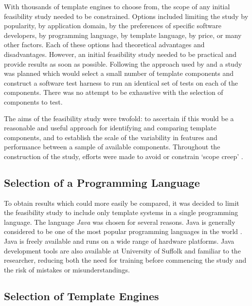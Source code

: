 With thousands of template engines to choose from, the scope of any initial feasibility study needed to be constrained. Options included limiting the study by popularity, by application domain, by the preferences of specific software developers, by programming language, by template language, by price, or many other factors. Each of these options had theoretical advantages and disadvantages. However, an initial feasibility study needed to be practical and provide results as soon as possible. Following the approach used by \citet{Laakso2008} and \citet{Zoio2005} a study was planned which would select a small number of template components and construct a software test harness to run an identical set of tests on each of the components. There was no attempt to be exhaustive with the selection of components to test.

The aims of the feasibility study were twofold: to ascertain if this would be a reasonable and useful approach for identifying and comparing template components, and to establish the scale of the variability in features and performance between a sample of available components. Throughout the construction of the study, efforts were made to avoid or constrain `scope creep' \citep{Heinze2014}.

\subsection{Selection of a Programming Language}

To obtain results which could more easily be compared, it was decided to limit the feasibility study to include only template systems in a single programming language. The language \emph{Java} \citep{Oracle2018Java} was chosen for several reasons. Java is generally considered to be one of the most popular programming languages in the world \citep{Tiobe2018}. Java is freely available and runs on a wide range of hardware platforms. Java development tools are also available at University of Suffolk and familiar to the researcher, reducing both the need for training before commencing the study and the risk of mistakes or misunderstandings.

\subsection{Selection of Template Engines}

